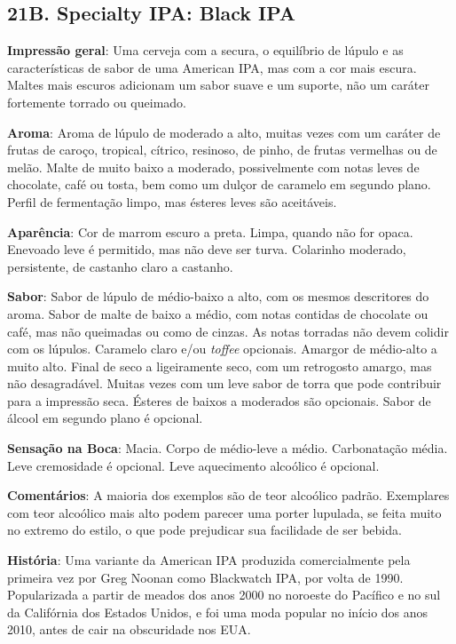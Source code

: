 \subsection*{21B. Specialty IPA: Black IPA}
\textbf{Impressão geral}: Uma cerveja com a secura, o equilíbrio de lúpulo e as características de sabor de uma American IPA, mas com a cor mais escura. Maltes mais escuros adicionam um sabor suave e um suporte, não um caráter fortemente torrado ou queimado.

\textbf{Aroma}: Aroma de lúpulo de moderado a alto, muitas vezes com um caráter de frutas de caroço, tropical, cítrico, resinoso, de pinho, de frutas vermelhas ou de melão. Malte de muito baixo a moderado, possivelmente com notas leves de chocolate, café ou tosta, bem como um dulçor de caramelo em segundo plano. Perfil de fermentação limpo, mas ésteres leves são aceitáveis.

\textbf{Aparência}: Cor de marrom escuro a preta. Limpa, quando não for opaca. Enevoado leve é permitido, mas não deve ser turva. Colarinho moderado, persistente, de castanho claro a castanho.

\textbf{Sabor}: Sabor de lúpulo de médio-baixo a alto, com os mesmos descritores do aroma. Sabor de malte de baixo a médio, com notas contidas de chocolate ou café, mas não queimadas ou como de cinzas. As notas torradas não devem colidir com os lúpulos. Caramelo claro e/ou \textit{toffee} opcionais. Amargor de médio-alto a muito alto. Final de seco a ligeiramente seco, com um retrogosto amargo, mas não desagradável. Muitas vezes com um leve sabor de torra que pode contribuir para a impressão seca. Ésteres de baixos a moderados são opcionais. Sabor de álcool em segundo plano é opcional.

\textbf{Sensação na Boca}: Macia. Corpo de médio-leve a médio. Carbonatação média. Leve cremosidade é opcional. Leve aquecimento alcoólico é opcional.

\textbf{Comentários}: A maioria dos exemplos são de teor alcoólico padrão. Exemplares com teor alcoólico mais alto podem parecer uma porter lupulada, se feita muito no extremo do estilo, o que pode prejudicar sua facilidade de ser bebida.

\textbf{História}: Uma variante da American IPA produzida comercialmente pela primeira vez por Greg Noonan como Blackwatch IPA, por volta de 1990. Popularizada a partir de meados dos anos 2000 no noroeste do Pacífico e no sul da Califórnia dos Estados Unidos, e foi uma moda popular no início dos anos 2010, antes de cair na obscuridade nos EUA.

